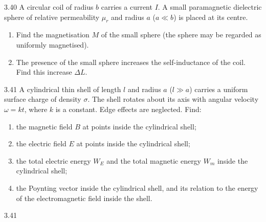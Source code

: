\begin{problem}{3.40}
A circular coil of radius $b$ carries a current $I$. A small paramagnetic dielectric sphere of relative permeability $\mu_r$ and radius $a$ ($a\ll b$) is placed at its centre.
\begin{enumerate}[label=(\arabic*),leftmargin=2.2em,itemsep=1pt,topsep=2pt]
\item Find the magnetisation $M$ of the small sphere (the sphere may be regarded as uniformly magnetised).
\item The presence of the small sphere increases the self-inductance of the coil. Find this increase $\Delta L$.
\end{enumerate}
\end{problem}

\begin{problem}{3.41}
A cylindrical thin shell of length $l$ and radius $a$ ($l\gg a$) carries a uniform surface charge of density $\sigma$. The shell rotates about its axis with angular velocity $\omega=kt$, where $k$ is a constant. Edge effects are neglected. Find:
\begin{enumerate}[label=(\arabic*),leftmargin=2.2em,itemsep=1pt,topsep=2pt]
\item the magnetic field $B$ at points inside the cylindrical shell;
\item the electric field $E$ at points inside the cylindrical shell;
\item the total electric energy $W_E$ and the total magnetic energy $W_m$ inside the cylindrical shell;
\item the Poynting vector inside the cylindrical shell, and its relation to the energy of the electromagnetic field inside the shell.
\end{enumerate}
\end{problem}

\begin{figbox}{3.41}
\end{figbox}

